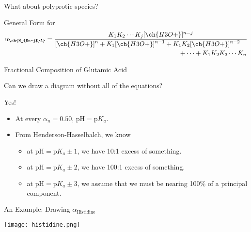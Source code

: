 \documentclass[handout]{beamer}
\begin{document}
\begin{frame}{What about polyprotic species?}
	\begin{block}{General Form for }
		\begin{align*}
		\alpha_{\ch{H_{$n-j$}A}} = \frac{K_1 K_2 \cdots K_j
		[\ch{H3O+}]^{n-j}}{
			\begin{multlined}
				[\ch{H3O+}]^n + K_1 [\ch{H3O+}]^{n-1} + K_1K_2
				[\ch{H3O+}]^{n-2} \\ + \cdots + K_1 K_2 K_3
				\cdots K_n
			\end{multlined}
			}
		\end{align*}

%
	\end{block}
\end{frame}

\begin{frame}{Fractional Composition of Glutamic Acid}
	\begin{center}
		
	\end{center}
\end{frame}

\begin{frame}{Can we draw a diagram without all of the equations?}
	\pause

	\alert{Yes!}

	\begin{itemize}
		\item At every $\alpha_n = 0.50$, $\text{pH} = \text{p}K_a$.
		\item From Henderson-Hasselbalch, we know
			\begin{itemize}
				\item at $\text{pH} = \text{p}K_a \pm 1$, we
					have 10:1 excess of something.
				\item at $\text{pH} = \text{p}K_a \pm 2$, we
					have 100:1 excess of something.
				\item at $\text{pH} = \text{p}K_a \pm 3$, we
					assume that we must be nearing
					\alert{100\%} of a principal component.
			\end{itemize}
	\end{itemize}
\end{frame}

\begin{frame}[allowframebreaks]{An Example: Drawing $\alpha_{\text{Histidine}}$}
	\begin{center}
		\texttt{[image: histidine.png]}
	\end{center}

	\framebreak

	\begin{center}
		
	\end{center}

%		
\end{frame}
\end{document}
